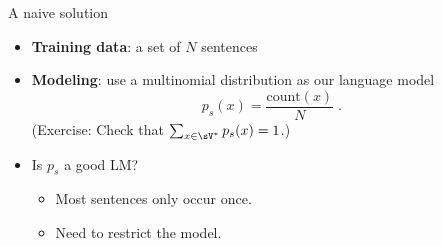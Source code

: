 \documentclass[usenames,dvipsnames,notes,11pt,aspectratio=169,hyperref={colorlinks=true, linkcolor=blue}]{beamer}
\newcommand{\pdfnote}[1]{}
\begin{document}
\begin{frame}
    {A naive solution}
    \begin{itemize}[<+->]
        \itemsep1em
        \item \textbf{Training data}: a set of $N$ sentences %
        \item \textbf{Modeling}: use a multinomial distribution as our language model 
            $$
            p_s(x) = \frac{\text{count}(x)}{N} \;.
            $$
            (Exercise: Check that $\sum_{x\in\sV^*}p_s(x) = 1$.)
        \item Is $p_s$ a good LM?\pause
            \begin{itemize}
                \item Most sentences only occur once. \hspace{2cm}
                \item Need to restrict the model. 
            \end{itemize}
    \end{itemize}
    \pdfnote{
        Let's consider a multinomial distribution over the sentences,
        where each sentence is an event, and we estimate the probability of each sentence by its fraction in the corpus.
        Specifically, the count of its occurence divided by the total number of sentences.
    }
    \pdfnote{
        This says that our model is too flexible. The number of parameters are the total number of sentences, which increases exponentially with the vocab size. It can approximate any distribution but we won't be able to estimate the model with limited data.
    }
\end{frame}
\end{document}
